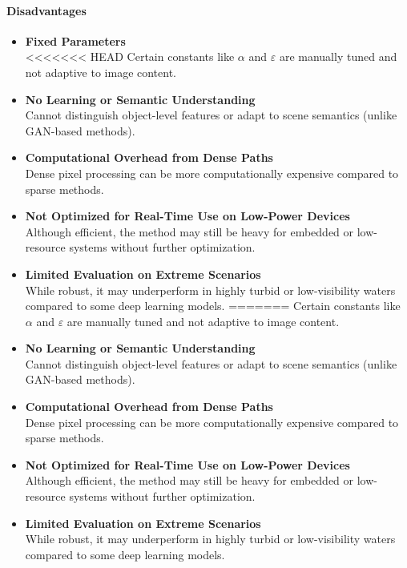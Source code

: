 \documentclass{article}
\begin{document}
\paragraph{Disadvantages}

\begin{itemize}
    \item \textbf{Fixed Parameters} \\
<<<<<<< HEAD
    Certain constants like $\alpha$ and $\varepsilon$ are manually tuned and not adaptive to image content.

    \item \textbf{No Learning or Semantic Understanding} \\
    Cannot distinguish object-level features or adapt to scene semantics (unlike GAN-based methods).

    \item \textbf{Computational Overhead from Dense Paths} \\
    Dense pixel processing can be more computationally expensive compared to sparse methods.

    \item \textbf{Not Optimized for Real-Time Use on Low-Power Devices} \\
    Although efficient, the method may still be heavy for embedded or low-resource systems without further optimization.

    \item \textbf{Limited Evaluation on Extreme Scenarios} \\
    While robust, it may underperform in highly turbid or low-visibility waters compared to some deep learning models.
=======
          Certain constants like $\alpha$ and $\varepsilon$ are manually tuned and not adaptive to image content.

    \item \textbf{No Learning or Semantic Understanding} \\
          Cannot distinguish object-level features or adapt to scene semantics (unlike GAN-based methods).

    \item \textbf{Computational Overhead from Dense Paths} \\
          Dense pixel processing can be more computationally expensive compared to sparse methods.

    \item \textbf{Not Optimized for Real-Time Use on Low-Power Devices} \\
          Although efficient, the method may still be heavy for embedded or low-resource systems without further optimization.

    \item \textbf{Limited Evaluation on Extreme Scenarios} \\
          While robust, it may underperform in highly turbid or low-visibility waters compared to some deep learning models.
\end{itemize}
\end{document}
